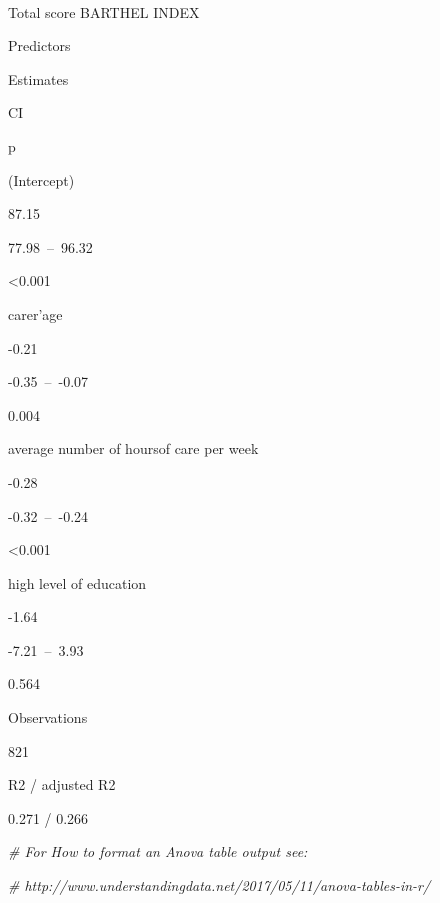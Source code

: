 \documentclass[]{article}
\newenvironment{Shaded}{\begin{snugshade}}{\end{snugshade}}
\newcommand{\CommentTok}[1]{\textcolor[rgb]{0.56,0.35,0.01}{\textit{#1}}}
\begin{document}
~

Total score BARTHEL INDEX

Predictors

Estimates

CI

p

(Intercept)

87.15

77.98~--~96.32

\textless{}0.001

carer'age

-0.21

-0.35~--~-0.07

0.004

average number of hoursof care per week

-0.28

-0.32~--~-0.24

\textless{}0.001

high level of education

-1.64

-7.21~--~3.93

0.564

Observations

821

R2 / adjusted R2

0.271 / 0.266

\begin{Shaded}
\begin{Highlighting}[]
\CommentTok{# For How to format an Anova table output see:}

\CommentTok{# http://www.understandingdata.net/2017/05/11/anova-tables-in-r/}
\end{Highlighting}
\end{Shaded}
\end{document}
